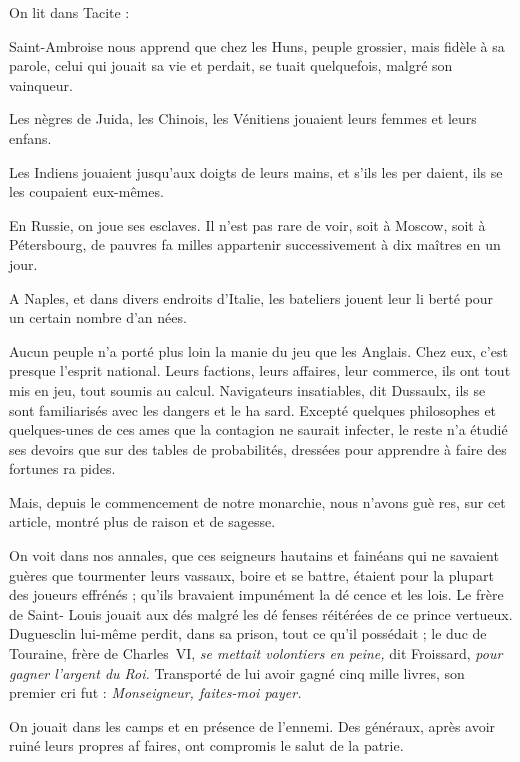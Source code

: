 On lit dans Tacite : 

Saint-Ambroise nous apprend que
chez les Huns, peuple grossier, mais
fidèle à sa parole, celui qui jouait sa
vie et perdait, se tuait quelquefois,
malgré son vainqueur.

Les nègres de Juida, les Chinois,
les Vénitiens jouaient leurs femmes
et leurs enfans.

Les Indiens jouaient jusqu'aux
doigts de leurs mains, et s'ils les per%
daient, ils se les coupaient eux-mêmes.

En Russie, on joue ses esclaves. Il
n'est pas rare de voir, soit à Moscow,
soit à Pétersbourg, de pauvres fa%
milles appartenir successivement à
dix maîtres en un jour.

A Naples, et dans divers endroits
d'Italie, les bateliers jouent leur li%
berté pour un certain nombre d'an%
nées.

Aucun peuple n'a porté plus loin
la manie du jeu que les Anglais. Chez
eux, c'est presque l'esprit national.
Leurs factions, leurs affaires, leur
commerce, ils ont tout mis en jeu,
tout soumis au calcul. Navigateurs
insatiables, dit Dussaulx, ils se sont
familiarisés avec les dangers et le ha%
sard. Excepté quelques philosophes
et quelques-unes de ces ames que la
contagion ne saurait infecter, le reste
n'a étudié ses devoirs que sur des
tables de probabilités, dressées pour
apprendre à faire des fortunes ra%
pides.

Mais, depuis le commencement de
notre monarchie, nous n'avons guè%
res, sur cet article, montré plus de
raison et de sagesse.

On voit dans nos annales, que ces
seigneurs hautains et fainéans qui ne
savaient guères que tourmenter leurs
vassaux, boire et se battre, étaient
pour la plupart des joueurs effrénés ;
qu'ils bravaient impunément la dé%
cence et les lois. Le frère de Saint-%
Louis jouait aux dés malgré les dé%
fenses réitérées de ce prince vertueux.
Duguesclin lui-même perdit, dans sa
prison, tout ce qu'il possédait ; le
duc de Touraine, frère de Charles~VI,
\emph{se mettait volontiers en peine,} dit
Froissard, \emph{pour gagner l'argent du
Roi.} Transporté de lui avoir gagné
cinq mille livres, son premier cri fut :
\emph{Monseigneur, faites-moi payer.}

On jouait dans les camps et en
présence de l'ennemi. Des généraux,
après avoir ruiné leurs propres af%
faires, ont compromis le salut de la
patrie.

